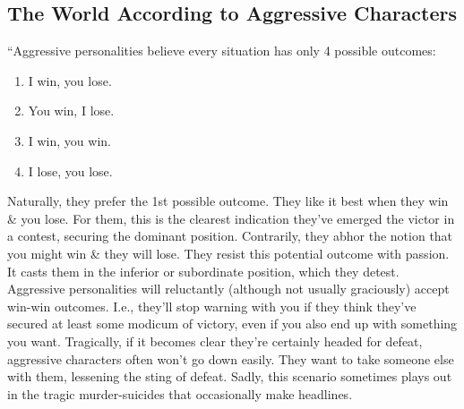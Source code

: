 \documentclass{article}
\numberwithin{equation}{section}
\begin{document}
\subsection{The World According to Aggressive Characters}
``Aggressive personalities believe every situation has only 4 possible outcomes:
\begin{enumerate}
    \item I win, you lose.
    \item You win, I lose.
    \item I win, you win.
    \item I lose, you lose.
\end{enumerate}
Naturally, they prefer the 1st possible outcome. They like it best when they win \& you lose. For them, this is the clearest indication they've emerged the victor in a contest, securing the dominant position. Contrarily, they abhor the notion that you might win \& they will lose. They resist this potential outcome with passion. It casts them in the inferior or subordinate position, which they detest. Aggressive personalities will reluctantly (although not usually graciously) accept win-win outcomes. I.e., they'll stop warning with you if they think they've secured at least some modicum of victory, even if you also end up with something you want. Tragically, if it becomes clear they're certainly headed for defeat, aggressive characters often won't go down easily. They want to take someone else with them, lessening the sting of defeat. Sadly, this scenario sometimes plays out in the tragic murder-suicides that occasionally make headlines.
\end{document}

